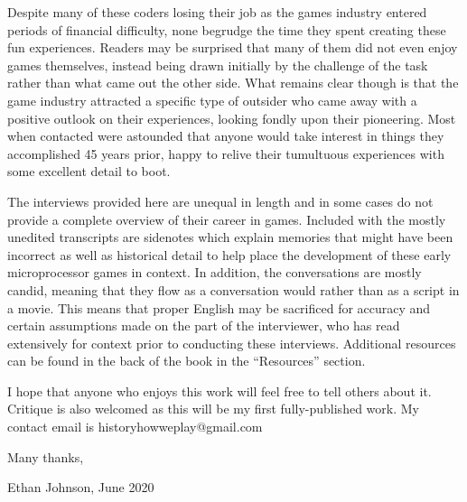 Despite many of these coders losing their job as the games industry entered periods of financial difficulty, none begrudge the time they spent creating these fun experiences. Readers may be surprised that many of them did not even enjoy games themselves, instead being drawn initially by the challenge of the task rather than what came out the other side. What remains clear though is that the game industry attracted a specific type of outsider who came away with a positive outlook on their experiences, looking fondly upon their pioneering. Most when contacted were astounded that anyone would take interest in things they accomplished 45 years prior, happy to relive their tumultuous experiences with some excellent detail to boot.

The interviews provided here are unequal in length and in some cases do not provide a complete overview of their career in games. Included with the mostly unedited transcripts are sidenotes which explain memories that might have been incorrect as well as historical detail to help place the development of these early microprocessor games in context. In addition, the conversations are mostly candid, meaning that they flow as a conversation would rather than as a script in a movie. This means that proper English may be sacrificed for accuracy and certain assumptions made on the part of the interviewer, who has read extensively for context prior to conducting these interviews. Additional resources can be found in the back of the book in the “Resources” section.

I hope that anyone who enjoys this work will feel free to tell others about it. Critique is also welcomed as this will be my first fully-published work. My contact email is historyhowweplay@gmail.com

Many thanks,

Ethan Johnson, June 2020